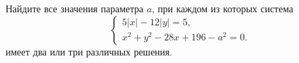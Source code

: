 \begin{ex}
	\begin{condition}
		Найдите все значения параметра \( a \), при каждом из которых система
		\[ \left\{
		\begin{array}{l}
			5|x|-12|y|=5,\\
			x^2+y^2-28x+196-a^2=0.
		\end{array}
		\right. \]
		имеет два или три различных решения.
	\end{condition}
\end{ex}